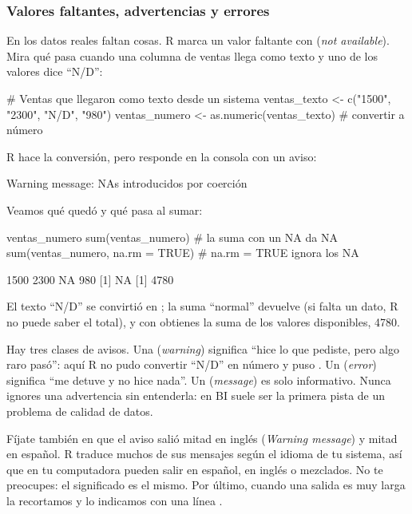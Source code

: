 \subsubsection{Valores faltantes, advertencias y errores}

En los datos reales faltan cosas. R marca un valor faltante con
 (\textit{not available}). Mira qué pasa cuando una columna de
ventas llega como texto y uno de los valores dice ``N/D'':

\begin{rcode}
# Ventas que llegaron como texto desde un sistema
ventas_texto <- c("1500", "2300", "N/D", "980")
ventas_numero <- as.numeric(ventas_texto)   # convertir a número
\end{rcode}

R hace la conversión, pero responde en la consola con un aviso:

\begin{rsalida}
Warning message:
NAs introducidos por coerción
\end{rsalida}

Veamos qué quedó y qué pasa al sumar:

\begin{rcode}
ventas_numero
sum(ventas_numero)                 # la suma con un NA da NA
sum(ventas_numero, na.rm = TRUE)   # na.rm = TRUE ignora los NA
\end{rcode}

\begin{rsalida}
[1] 1500 2300   NA  980
[1] NA
[1] 4780
\end{rsalida}

El texto ``N/D'' se convirtió en ; la suma ``normal'' devuelve
 (si falta un dato, R no puede saber el total), y con
 obtienes la suma de los valores disponibles, 4780.

Hay tres clases de avisos. Una 
(\textit{warning}) significa ``hice lo que pediste, pero algo raro pasó'':
aquí R no pudo convertir ``N/D'' en número y puso . Un
 (\textit{error}) significa ``me detuve y no hice nada''. Un
 (\textit{message}) es solo informativo. Nunca ignores una
advertencia sin entenderla: en BI suele ser la primera pista de un problema
de calidad de datos.

Fíjate también en que el aviso salió mitad en inglés (\textit{Warning
message}) y mitad en español. R traduce muchos de sus mensajes según el
idioma de tu sistema, así que en tu computadora pueden salir en español, en
inglés o mezclados. No te preocupes: el significado es el mismo. Por último,
cuando una salida es muy larga la recortamos y lo indicamos con una línea
.

